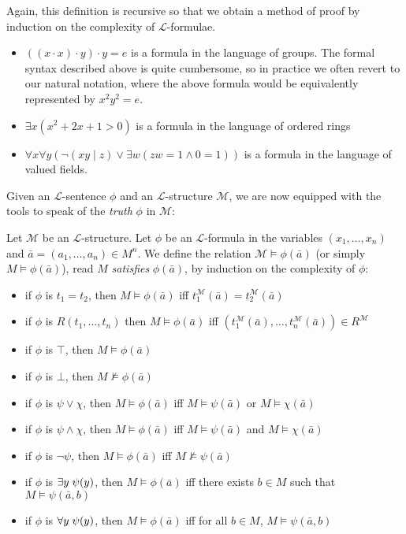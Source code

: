 Again, this definition is recursive so that we obtain a method of proof by induction on the complexity of $\mathcal{L}$-formulae.

\begin{example}
	\begin{itemize}
		\item $((x\cdot x)\cdot y)\cdot y=e$ is a formula in the language of groups. The formal syntax described above is quite cumbersome, so in practice we often revert to our natural notation, where the above formula would be equivalently represented by $x^2y^2=e$.
		\item $\exists x(x^2+2x+1>0)$ is a formula in the language of ordered rings
		\item $\forall x\forall y(\neg(xy\mid z)\vee \exists w(zw=1 \wedge 0=1))$ is a formula in the language of valued fields.
	\end{itemize}
\end{example}

Given an $\mathcal{L}$-sentence $\phi$ and an $\mathcal{L}$-structure $\mathcal{M}$, we are now equipped with the tools to speak of the \emph{truth} $\phi$ in $\mathcal{M}$:

\begin{definition}
Let $\mathcal{M}$ be an $\mathcal{L}$-structure. Let $\phi$ be an $\mathcal{L}$-formula in the variables $(x_1,\dots,x_n)$ and $\bar{a}=(a_1,\dots,a_n)\in M^n$. We define the relation $\mathcal{M}\models \phi(\bar{a})$ (or simply $M\models \phi(\bar{a})$), read $M$ \emph{satisfies} $\phi(\bar{a})$, by induction on the complexity of $\phi$:
	\begin{itemize}
		\item if $\phi$ is $t_1=t_2$, then $M\models\phi(\bar{a})$ iff $t_1^{\mathcal{M}}(\bar{a})=t_2^{\mathcal{M}}(\bar{a})$
		\item if $\phi$ is $R(t_1,\dots, t_n)$ then $M\models\phi(\bar{a})$ iff $(t_1^{\mathcal{M}}(\bar{a}),\dots, t_n^{\mathcal{M}}(\bar{a}))\in R^{\mathcal{M}}$
		\item if $\phi$ is $\top$, then $M\models\phi(\bar{a})$
		\item if $\phi$ is $\bot$, then $M\not\models\phi(\bar{a})$
		\item if $\phi$ is $\psi\vee \chi$, then $M\models \phi(\bar{a})$ iff $M\models \psi(\bar{a})$ or $M\models \chi(\bar{a})$
		\item if $\phi$ is $\psi\wedge \chi$, then $M\models \phi(\bar{a})$ iff $M\models \psi(\bar{a})$ and $M\models \chi(\bar{a})$
		\item if $\phi$ is $\neg\psi$, then $M\models \phi(\bar{a})$ iff $M\not\models \psi(\bar{a})$
		\item if $\phi$ is $\exists y\hspace{0.1cm}\psi(y)$, then $M\models \phi(\bar{a})$ iff there exists $b\in M$ such that $M\models \psi(\bar{a},b)$
		\item if $\phi$ is $\forall y\hspace{0.1cm}\psi(y)$, then $M\models \phi(\bar{a})$ iff for all $b\in M$, $M\models \psi(\bar{a},b)$
	\end{itemize}
\end{definition}

